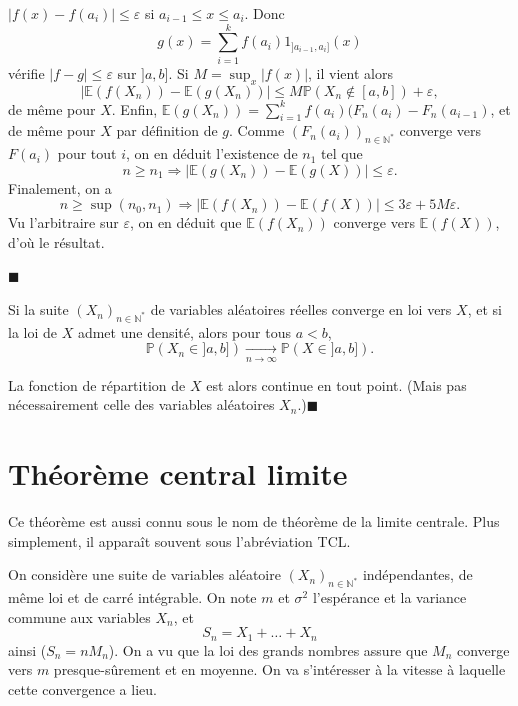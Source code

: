 \begin{preuve}
\begin{enumerate}
  \(|f(x) - f(a_i)|\leq \varepsilon\) si \(a_{i-1} \leq x \leq a_i\).
  Donc \[ g(x) = \sum_{i=1}^k f(a_i)1_{]a_{i-1},a_i]}(x)\] vérifie
  \(|f-g| \leq \varepsilon\) sur \(]a,b]\). Si \(M = \sup_x |f(x)|\), il
  vient alors
  \[|\mathbb{E}(f(X_n))-\mathbb{E}(g(X_n))| \leq M \mathbb{P}(X_n \notin [a,b]) + \varepsilon,\]
  de même pour \(X\). Enfin,
  \(\mathbb{E}(g(X_n)) = \sum_{i=1}^k f(a_i)(F_n(a_i) - F_n(a_{i-1})\),
  et de même pour \(X\) par définition de \(g\). Comme
  \((F_n(a_i))_{n \in \mathbb{N}^\ast}\) converge vers \(F(a_i)\) pour
  tout \(i\), on en déduit l'existence de \(n_1\) tel que
  \[ n\geq n_1 \Rightarrow |\mathbb{E}(g(X_n)) - \mathbb{E}(g(X))|\leq \varepsilon.\]
  Finalement, on a
  \[ n \geq \sup(n_0,n_1) \Rightarrow |\mathbb{E}(f(X_n))-\mathbb{E}(f(X))|\leq 3\varepsilon + 5 M \varepsilon .\]
  Vu l'arbitraire sur \(\varepsilon\), on en déduit que
  \(\mathbb{E}(f(X_n))\) converge vers \(\mathbb{E}(f(X))\), d'où le
  résultat.
\end{enumerate}

\hfill$\blacksquare$
\end{preuve}

\begin{corollaire}\label{IV-cas-ouxf9-x-admet-une-densituxe9}

Si la suite \((X_n)_{n\in\mathbb{N}^\ast}\) de variables aléatoires
réelles converge en loi vers \(X\), et si la loi de \(X\) admet une
densité, alors pour tous \(a< b\),
\[ \mathbb{P}(X_n \in ]a,b]) \xrightarrow[n\to \infty]{} \mathbb{P}(X\in]a,b]).\]
\end{corollaire}

\begin{preuve}
La fonction de répartition de \(X\) est alors continue en tout point.
(Mais pas nécessairement celle des variables aléatoires
\(X_n\).)\hfill$\blacksquare$
\end{preuve}

\section{Théorème central
limite}\label{IV-thuxe9oruxe8me-central-limite}

Ce théorème est aussi connu sous le nom de théorème de la limite
centrale. Plus simplement, il apparaît souvent sous l'abréviation TCL.

On considère une suite de variables aléatoire
\((X_n)_{n \in \mathbb{N}^\ast}\) indépendantes, de même loi et de carré
intégrable. On note \(m\) et \(\sigma^2\) l'espérance et la variance
commune aux variables \(X_n\), et \[S_n = X_1 + \ldots + X_n\] ainsi
(\(S_n = n M_n\)). On a vu que la loi des grands nombres assure que
\(M_n\) converge vers \(m\) presque-sûrement et en moyenne. On va
s'intéresser à la vitesse à laquelle cette convergence a lieu.

